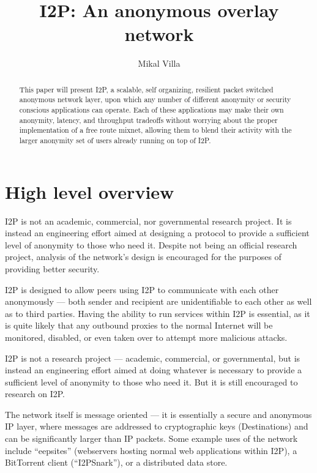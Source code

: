\documentclass[a4paper,twocolumn,12pt]{article}
\title{I2P: An anonymous overlay network}
\author{Mikal Villa}
\begin{document}
\maketitle

\begin{abstract}\noindent
This paper will present I2P, a scalable, self organizing, resilient packet switched anonymous network layer, upon which any number of different anonymity or security conscious applications can operate. Each of these applications may make their own anonymity, latency, and throughput tradeoffs without worrying about the proper implementation of a free route mixnet, allowing them to blend their activity with the larger anonymity set of users already running on top of I2P.
\end{abstract}

\tableofcontents

\section{High level overview}
I2P is not an academic, commercial, nor governmental research project. It is instead an engineering effort aimed at designing a protocol to provide a sufficient level of anonymity to those who need it. Despite not being an official research project, analysis of the network's design is encouraged for the purposes of providing better security.

I2P is designed to allow peers using I2P to communicate with each other anonymously --- both sender and recipient are unidentifiable to each other as well as to third parties. Having the ability to run services within I2P is essential, as it is quite likely that any outbound proxies to the normal Internet will be monitored, disabled, or even taken over to attempt more malicious attacks.

I2P is not a research project --- academic, commercial, or governmental, but is instead an engineering effort aimed at doing whatever is necessary to provide a sufficient level of anonymity to those who need it. But it is still encouraged to research on I2P.

The network itself is message oriented --- it is essentially a secure and anonymous IP layer, where messages are addressed to cryptographic keys (Destinations) and can be significantly larger than IP packets. Some example uses of the network include ``eepsites'' (webservers hosting normal web applications within I2P), a BitTorrent client (``I2PSnark''), or a distributed data store.
\end{document}
